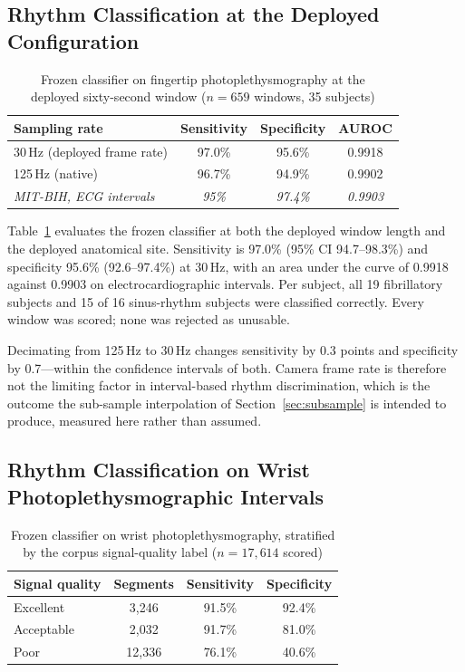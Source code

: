 \documentclass[conference]{IEEEtran}
\begin{document}
\subsection{Rhythm Classification at the Deployed Configuration}

\begin{table}[t]
\caption{Frozen classifier on fingertip photoplethysmography at the\\
deployed sixty-second window ($n = 659$ windows, 35 subjects)}
\label{tab:mimic}
\centering
\footnotesize
\begin{tabular}{lccc}
\toprule
Sampling rate & Sensitivity & Specificity & AUROC \\
\midrule
30\,Hz (deployed frame rate) & 97.0\% & 95.6\% & 0.9918 \\
125\,Hz (native)             & 96.7\% & 94.9\% & 0.9902 \\
\midrule
\emph{MIT-BIH, ECG intervals} & \emph{95\%} & \emph{97.4\%} & \emph{0.9903} \\
\bottomrule
\end{tabular}
\end{table}

Table~\ref{tab:mimic} evaluates the frozen classifier at both the deployed window length
and the deployed anatomical site. Sensitivity is 97.0\% (95\% CI 94.7--98.3\%) and
specificity 95.6\% (92.6--97.4\%) at 30\,Hz, with an area under the curve of 0.9918
against 0.9903 on electrocardiographic intervals. Per subject, all 19 fibrillatory
subjects and 15 of 16 sinus-rhythm subjects were classified correctly. Every window was
scored; none was rejected as unusable.

Decimating from 125\,Hz to 30\,Hz changes sensitivity by 0.3 points and specificity by
0.7---within the confidence intervals of both. Camera frame rate is therefore not the
limiting factor in interval-based rhythm discrimination, which is the outcome the
sub-sample interpolation of Section~\ref{sec:subsample} is intended to produce, measured
here rather than assumed.

\subsection{Rhythm Classification on Wrist Photoplethysmographic Intervals}

\begin{table}[t]
\caption{Frozen classifier on wrist photoplethysmography, stratified\\
by the corpus signal-quality label ($n = 17{,}614$ scored)}
\label{tab:deepbeat}
\centering
\footnotesize
\begin{tabular}{lccc}
\toprule
Signal quality & Segments & Sensitivity & Specificity \\
\midrule
Excellent  & 3{,}246  & 91.5\% & 92.4\% \\
Acceptable & 2{,}032  & 91.7\% & 81.0\% \\
Poor       & 12{,}336 & 76.1\% & 40.6\% \\
\bottomrule
\end{tabular}
\end{table}
\end{document}
